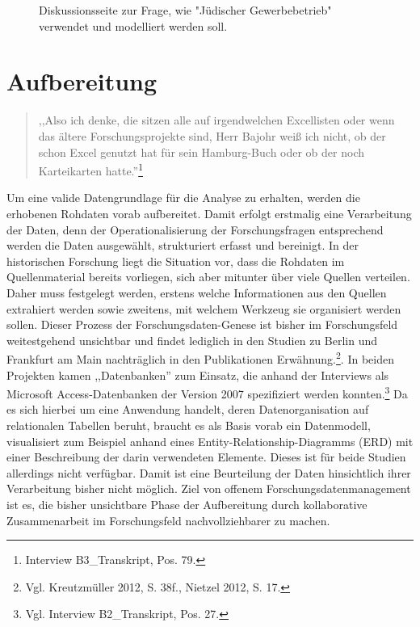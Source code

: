 \begin{figure}[h]
    \centering
    \caption{Diskussionsseite zur Frage, wie "Jüdischer Gewerbebetrieb" verwendet und modelliert werden soll.}
    \label{fig:x cubed graph}
\end{figure}

\section{Aufbereitung}

\begin{quote}
    ,,Also ich denke, die sitzen alle auf irgendwelchen Excellisten oder wenn das ältere Forschungsprojekte sind, Herr Bajohr weiß ich nicht, ob der schon Excel genutzt hat für sein Hamburg-Buch oder ob der noch Karteikarten hatte.''\footnote{Interview B3\_Transkript, Pos. 79.}
\end{quote}

Um eine valide Datengrundlage für die Analyse zu erhalten, werden die erhobenen Rohdaten vorab aufbereitet. Damit erfolgt erstmalig eine Verarbeitung der Daten, denn der Operationalisierung der Forschungsfragen entsprechend werden die Daten ausgewählt, strukturiert erfasst und bereinigt. In der historischen Forschung liegt die Situation vor, dass die Rohdaten im Quellenmaterial bereits vorliegen, sich aber mitunter über viele Quellen verteilen. Daher muss festgelegt werden, erstens welche Informationen aus den Quellen extrahiert werden sowie zweitens, mit welchem Werkzeug sie organisiert werden sollen. Dieser Prozess der Forschungsdaten-Genese ist bisher im Forschungsfeld weitestgehend unsichtbar und findet lediglich in den Studien zu Berlin und Frankfurt am Main nachträglich in den Publikationen Erwähnung.\footnote{Vgl. Kreutzmüller 2012, S. 38f., Nietzel 2012, S. 17.}. In beiden Projekten kamen ,,Datenbanken'' zum Einsatz, die anhand der Interviews als Microsoft Access-Datenbanken der Version 2007 spezifiziert werden konnten.\footnote{Vgl. Interview B2\_Transkript, Pos. 27.} Da es sich hierbei um eine Anwendung handelt, deren Datenorganisation auf relationalen Tabellen beruht, braucht es als Basis vorab ein Datenmodell, visualisiert zum Beispiel anhand eines Entity-Relationship-Diagramms (ERD) mit einer Beschreibung der darin verwendeten Elemente. Dieses ist für beide Studien allerdings nicht verfügbar. Damit ist eine Beurteilung der Daten hinsichtlich ihrer Verarbeitung bisher nicht möglich. Ziel von offenem Forschungsdatenmanagement ist es, die bisher unsichtbare Phase der Aufbereitung durch kollaborative Zusammenarbeit im Forschungsfeld nachvollziehbarer zu machen. 

